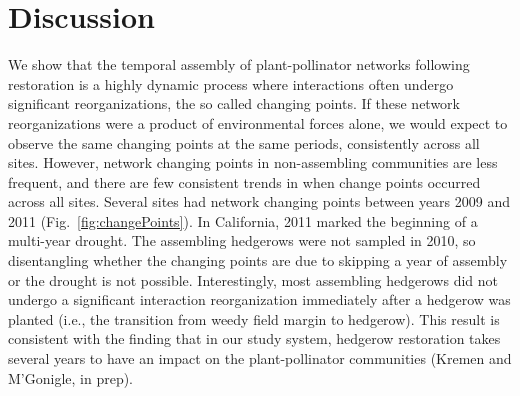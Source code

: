 \documentclass[12pt]{article}
\begin{document}
\section*{Discussion}
\label{sec:discussion}

We show that the temporal assembly of plant-pollinator networks
following restoration is a highly dynamic process where interactions
often undergo significant reorganizations, the so called changing
points. If these network reorganizations were a product of
environmental forces alone, we would expect to observe the same
changing points at the same periods, consistently across all
sites. However, network changing points in non-assembling communities
are less frequent, and there are few consistent trends in when change
points occurred across all sites. Several sites had network changing
points between years 2009 and 2011 (Fig.~\ref{fig:changePoints}). In
California, 2011 marked the beginning of a multi-year drought. The
assembling hedgerows were not sampled in 2010, so disentangling
whether the changing points are due to skipping a year of assembly or
the drought is not possible. Interestingly, most assembling hedgerows
did not undergo a significant interaction reorganization immediately
after a hedgerow was planted (i.e., the transition from weedy field
margin to hedgerow). This result is consistent with the finding that
in our study system, hedgerow restoration takes several years to have
an impact on the plant-pollinator communities (Kremen and M'Gonigle,
in prep).
\end{document}
